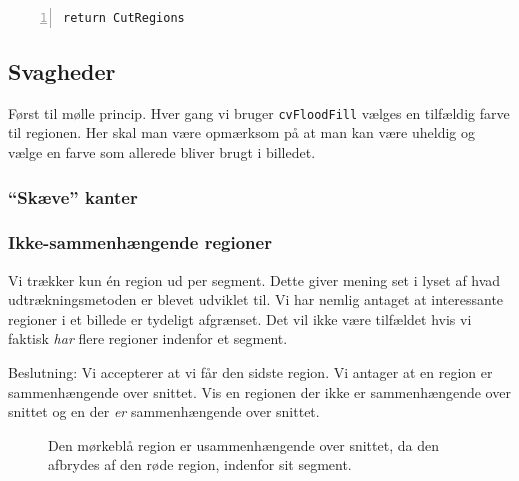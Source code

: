 {\begin{lstlisting}[caption={Pseudokode til udtrækning af regioner med
    margin.},captionpos=b,label={pseudo_udtraek_margin},numbers=left,
    frame=single, breaklines=false, float=h]
    return CutRegions
\end{lstlisting}

\subsection{Svagheder}
Først til mølle princip.
Hver gang vi bruger \texttt{cvFloodFill} vælges en tilfældig farve til
regionen. Her skal man være opmærksom på at man kan være uheldig og
vælge en farve som allerede bliver brugt i billedet.

\subsubsection{``Skæve'' kanter}

\subsubsection{Ikke-sammenhængende regioner}
Vi trækker kun én region ud per segment. Dette giver mening set i lyset
af hvad udtrækningsmetoden er blevet udviklet til. Vi har nemlig antaget
at interessante regioner i et billede er tydeligt afgrænset. Det vil
ikke være tilfældet hvis vi faktisk \emph{har} flere regioner indenfor
et segment.

Beslutning: Vi accepterer at vi får den sidste region. Vi antager at en
region er sammenhængende over snittet. Vis en regionen der ikke er
sammenhængende over snittet og en der \emph{er} sammenhængende over
snittet.

\begin{figure}[!h]
    \setlength\fboxsep{0pt}
    \setlength\fboxrule{0.5pt}
    \centering
    \caption[]{Den mørkeblå region er usammenhængende over snittet, da
    den afbrydes af den røde region, indenfor sit segment.}
    \label{usammenhaengende_region}
\end{figure}

}
